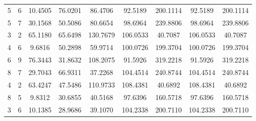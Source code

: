 \documentclass[withoutpreface,bwprint]{cumcmthesis}
\begin{document}
\begin{appendices}
\begin{table}[htbp!]
\begin{tabular}{@{}ccccccccc@{}}
				5              & 6              & 10.4505     & 76.0201     & 86.4706     & 92.5189         & 200.1114        & 92.5189         & 200.1114        \\
				5              & 7              & 30.1568     & 50.5086     & 80.6654     & 98.6964         & 239.8806        & 98.6964         & 239.8806        \\
				3              & 2              & 65.1180     & 65.6498     & 130.7679    & 106.0533        & 40.7087         & 106.0533        & 40.7087         \\
				4              & 6              & 9.6816      & 50.2898     & 59.9714     & 100.0726        & 199.3704        & 100.0726        & 199.3704        \\
				6              & 9              & 76.3443     & 31.8632     & 108.2075    & 91.5926         & 319.2218        & 91.5926         & 319.2218        \\
				8              & 7              & 29.7043     & 66.9311     & 37.2268     & 104.4514        & 240.8744        & 104.4514        & 240.8744        \\
				4              & 2              & 63.4247     & 47.5486     & 110.9733    & 108.4381        & 40.6892         & 108.4381        & 40.6892         \\
				8              & 5              & 9.8312      & 30.6855     & 40.5168     & 97.6396         & 160.5718        & 97.6396         & 160.5718        \\
				3              & 6              & 10.1385     & 28.9686     & 39.1070     & 104.2338        & 200.7110        & 104.2338        & 200.7110        \\ \bottomrule
			\end{tabular}
		\end{table}
		

\end{appendices}
\end{document}
